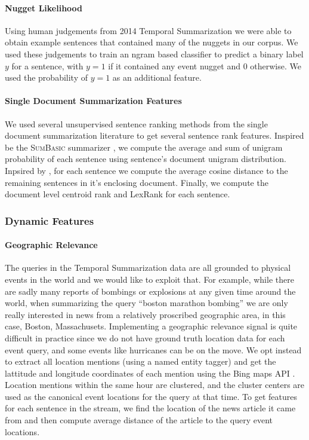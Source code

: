 \paragraph{Nugget Likelihood}
Using human judgements from 2014 Temporal Summarization we were able to obtain
example sentences that contained many of the nuggets in our corpus. We used
these judgements to train an ngram based classifier to predict a binary 
label $y$ for a sentence, with $y=1$ if it contained any event nugget and
$0$ otherwise. We used the probability of $y=1$ as an additional feature.

\paragraph{Single Document Summarization Features}
We used several unsupervised sentence ranking methods from the single 
document summarization literature to get several sentence rank features.
Inspired be the \textsc{SumBasic} summarizer \citep{nenkova2005impact}, we
compute the average and sum of unigram probability of each sentence using 
sentence's document unigram distribution. Inpsired by \citep{guo2013updating},
for each sentence we compute the average cosine distance to the remaining 
sentences in it's enclosing document. Finally, we compute the document
level centroid rank \citep{radev2000centroid} and LexRank 
\citep{erkan2004lexrank} for each sentence.

\subsubsection{Dynamic Features}
\paragraph{Geographic Relevance} 
The queries in the Temporal Summarization data are all grounded to physical
events in the world and we would like to exploit that. For example, while
there are sadly many reports of bombings or explosions at any given time 
around the world, when summarizing the query ``boston marathon bombing'' 
we are only really interested in news from a relatively proscribed 
geographic area, in this case, Boston, Massachusets. Implementing 
a geographic relevance signal is quite difficult in practice since 
we do not have ground truth location data for each event query, and some
events like hurricanes can be on the move. We opt instead to extract all
location mentions (using a named entity tagger) and get the lattitude
and longitude coordinates
of each mention using the Bing maps API \citep{bingmaps}. Location
mentions within the same hour are clustered, and the cluster centers are 
used as the canonical event locations for the query at that time. 
To get features for each sentence in the stream, we find the location of
the news article it came from and then compute average distance of the 
article to the query event locations.


